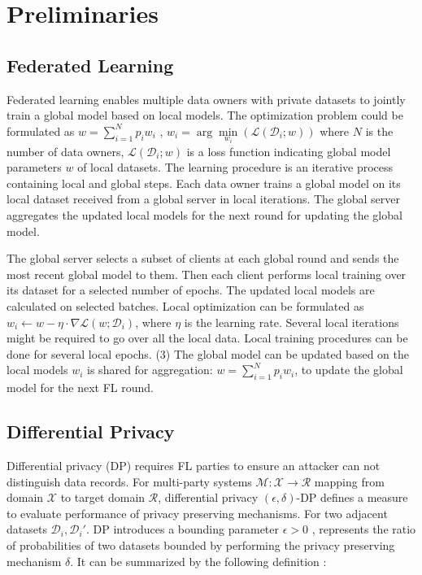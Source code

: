 \section{Preliminaries}
\label{sec:prelimianries}
\subsection{Federated Learning}



Federated learning enables multiple data owners with private datasets to jointly train a global model based on local models. The  optimization problem could be formulated as
${w} = \sum\limits_{i=1}^{N}{p_{i}{w}_{i}}$ , ${w}_{i}=\arg\min\limits_{{w}_{i}}{\left(\mathcal{L}(\mathcal{D}_{i};{w})\right)}$ where $N$ is the number of data owners, $\mathcal{L}(\mathcal{D}_{i};{w})$ is a loss function indicating global model parameters  ${w}$ of local datasets.  
 The learning procedure is an iterative process containing local and global steps. Each data owner trains a global model on its local dataset received from a global server in local iterations. The global server aggregates the updated local models for the next round for updating the global model. 
 
 The global server selects a subset of clients at each global round and sends the most recent global model to them. Then each client performs local training over its dataset for a selected number of epochs. The updated local models are calculated on selected batches. Local optimization can be formulated as ${w}_i \leftarrow {w}-\eta\cdot \nabla \mathcal{L}({w};\mathcal{D}_{i})$, where 
 $\eta$ is the learning rate. Several local iterations might be required to go over all the local data. Local training procedures can be done for several local epochs.
%
(3) The global model can be updated based on the local models ${w}_i$ is shared for aggregation: 
${w} = \sum\limits_{i=1}^{N}{p_{i}{w}_{i}}$, to update the global model for the next FL round.

\subsection{Differential Privacy}\label{sec:Differential Privacy}



 Differential privacy (DP) requires FL parties to ensure an attacker can not distinguish data records. For multi-party systems $\mathcal M: \mathcal{X}\rightarrow \mathcal{R}$ mapping from domain $\mathcal{X}$ to target domain $\mathcal{R}$, differential privacy  $(\epsilon, \delta)$-DP defines a measure to evaluate  performance of privacy preserving mechanisms.
For two adjacent datasets $\mathcal D_i, \mathcal D_i'$. DP introduces a bounding parameter $\epsilon > 0$ , represents the ratio of probabilities of two datasets bounded by performing the privacy preserving mechanism  $\delta$. It can be summarized by the following definition \cite{dwork2014algorithmic}:
 
